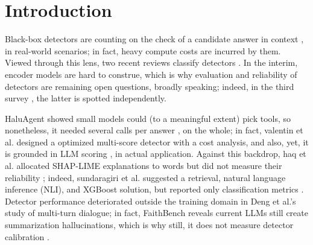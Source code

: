 \documentclass[a4paper,fleqn]{cas-sc}
\begin{document}
\begingroup
\hfuzz=120pt
\maketitle
\endgroup
{}
\linenumbers

\section{Introduction}\label{sec:intro}

Black-box detectors are counting on the check of a candidate answer in context \cite{selfcheck,luna,farquhar2024semantic,ieeeTai}, in real-world scenarios; in fact, heavy compute costs are incurred by them. Viewed through this lens, two recent reviews classify detectors \cite{ji2023survey,huang2025survey}. In the interim, encoder models are hard to construe, which is why evaluation and reliability of detectors are remaining open questions, broadly speaking; indeed, in the third survey \cite{alansari2026survey}, the latter is spotted independently.

HaluAgent showed small models could (to a meaningful extent) pick tools, so nonetheless, it needed several calls per answer \cite{haluagent}, on the whole; in fact, valentin et al. designed a optimized multi-score detector with a cost analysis, and also, yet, it is grounded in LLM scoring \cite{costeff}, in actual application. Against this backdrop, haq et al. allocated SHAP-LIME explanations to words but did not measure their reliability \cite{multimedia}; indeed, sundaragiri et al. suggested a retrieval, natural language inference (NLI), and XGBoost solution, but reported only classification metrics \cite{ijert}. Detector performance deteriorated outside the training domain \cite{spikescore} in Deng et al.'s study of multi-turn dialogue; in fact, FaithBench reveals current LLMs still create summarization hallucinations, which is why still, it does not measure detector calibration \cite{faithbench}.
\end{document}
